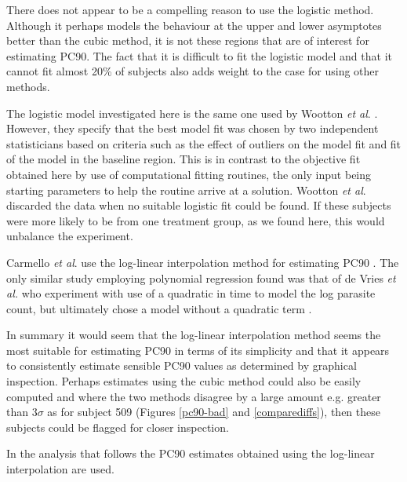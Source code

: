 There does not appear to be a compelling reason to use the logistic method. Although it perhaps models the behaviour at the upper and lower asymptotes better than the cubic method, it is not these regions that are of interest for estimating PC90. The fact that it is difficult to fit the logistic model and that it cannot fit almost 20\% of subjects also adds weight to the case for using other methods.

The logistic model investigated here is the same one used by Wootton \textit{et al}. \cite{wootton}. However, they specify that the best model fit was chosen by two independent statisticians based on criteria such as the effect of outliers on the model fit and fit of the model in the baseline region. This is in contrast to the objective fit obtained here by use of computational fitting routines, the only input being starting parameters to help the routine arrive at a solution. Wootton \textit{et al}. discarded the data when no suitable logistic fit could be found. If these subjects were more likely to be from one treatment group, as we found here, this would unbalance the experiment.

Carmello \textit{et al}. use the log-linear interpolation method for estimating PC90 \cite{carmello}. The only similar study employing polynomial regression found was that of de Vries \textit{et al.} who experiment with use of a quadratic in time to model the log parasite count, but ultimately chose a model without a quadratic term \cite{vries}.

In summary it would seem that the log-linear interpolation method seems the most suitable for estimating PC90 in terms of its simplicity and that it appears to consistently estimate sensible PC90 values as determined by graphical inspection. Perhaps estimates using the cubic method could also be easily computed and where the two methods disagree by a large amount e.g. greater than $3\sigma$ as for subject 509 (Figures \ref{pc90-bad} and \ref{comparediffs}), then these subjects could be flagged for closer inspection.

In the analysis that follows the PC90 estimates obtained using the log-linear interpolation are used.
